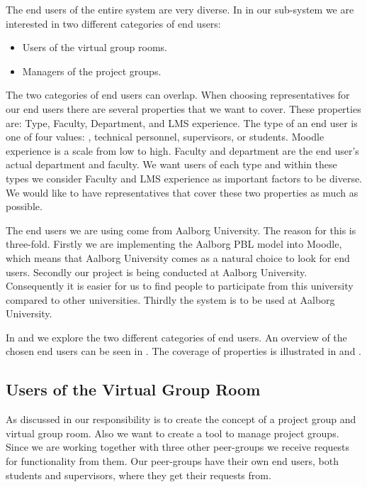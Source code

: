 The end users of the entire system are very diverse.
In in our sub-system we are interested in two different categories of end users:
\begin{itemize}
	\item Users of the virtual group rooms.
	\item Managers of the project groups.
\end{itemize}
The two categories of end users can overlap. 
When choosing representatives for our end users there are several properties that we want to cover. 
These properties are: Type, Faculty, Department, and LMS experience.
The type of an end user is one of four values: \admpers[c], technical personnel, supervisors, or students.
Moodle experience is a scale from low to high.
Faculty and department are the end user's actual department and faculty. %
We want users of each type and within these types we consider Faculty and LMS experience as important factors to be diverse.
We would like to have representatives that cover these two properties as much as possible.


The end users we are using come from Aalborg University.
The reason for this is three-fold.
Firstly we are implementing the Aalborg PBL model into Moodle, which means that Aalborg University comes as a natural choice to look for end users.
Secondly our project is being conducted at Aalborg University. 
Consequently it is easier for us to find people to participate from this university compared to other universities. 
Thirdly the system is to be used at Aalborg University.

In  and  we explore the two different categories of end users. 
An overview of the chosen end users can be seen in .
The coverage of properties is illustrated in  and .


\subsection{Users of the Virtual Group Room}
\label{sub:endusersmembers}
As discussed in  our responsibility is to create the concept of a project group and virtual group room.
Also we want to create a tool to manage project groups.
Since we are working together with three other peer-groups we receive requests for functionality from them.
Our peer-groups have their own end users, both students and supervisors, where they get their requests from.

